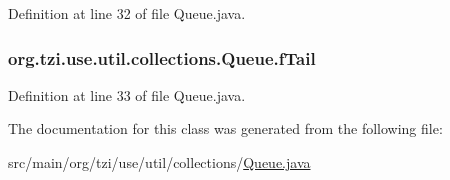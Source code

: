 Definition at line 32 of file Queue.\-java.

\hypertarget{classorg_1_1tzi_1_1use_1_1util_1_1collections_1_1_queue_a569a4efda2e8810ebe53176f9302c8b9}{
\subsubsection[{f\-Tail}]{ org.\-tzi.\-use.\-util.\-collections.\-Queue.\-f\-Tail\hspace{0.3cm}{\ttfamily [protected]}}}\label{classorg_1_1tzi_1_1use_1_1util_1_1collections_1_1_queue_a569a4efda2e8810ebe53176f9302c8b9}


Definition at line 33 of file Queue.\-java.



The documentation for this class was generated from the following file\-:\begin{DoxyCompactItemize}
\item 
src/main/org/tzi/use/util/collections/\hyperlink{_queue_8java}{Queue.\-java}\end{DoxyCompactItemize}
